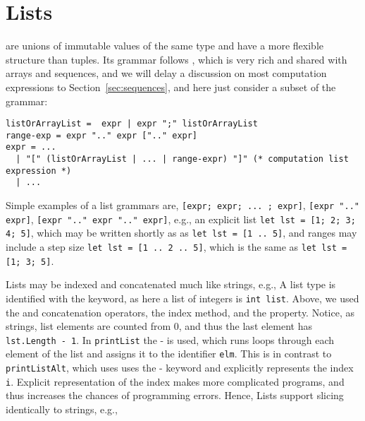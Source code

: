 \section{Lists}
 are unions of immutable values of the same type and have a more flexible structure than tuples. Its grammar follows , which is very rich and shared with arrays and sequences, and we will delay a discussion on most computation expressions to Section~\ref{sec:sequences}, and here just consider a subset of the grammar:
\begin{lstlisting}[language=ebnf]
listOrArrayList =  expr | expr ";" listOrArrayList
range-exp = expr ".." expr [".." expr]
expr = ... 
  | "[" (listOrArrayList | ... | range-expr) "]" (* computation list expression *)
  | ...
\end{lstlisting}
Simple examples of a list grammars are, \lstinline[language=ebnf]![expr; expr; ... ; expr]!, \lstinline[language=ebnf]![expr ".." expr]!, \lstinline[language=ebnf]![expr ".." expr ".." expr]!, e.g., an explicit list \lstinline!let lst = [1; 2; 3; 4; 5]!, which may be written shortly as  as \lstinline!let lst = [1 .. 5]!, and ranges may include a step size \lstinline!let lst = [1 .. 2 .. 5]!, which is the same as \lstinline!let lst = [1; 3; 5]!.

Lists may be indexed and concatenated much like strings, e.g.,
%
%
A list type is identified with the  keyword, as here a list of integers is \lstinline!int list!. Above, we used the  and \idx{\lexeme{::}} concatenation operators, the  index method, and the  property. Notice, as strings, list elements are counted from 0, and thus the last element has \lstinline!lst.Length - 1!. In \lstinline!printList! the - is used, which runs loops through each element of the list and assigns it to the identifier \lstinline!elm!. This is in contrast to \lstinline!printListAlt!, which uses uses the - keyword and explicitly represents the index \lstinline!i!. Explicit representation of the index makes more complicated programs, and thus increases the chances of programming errors. Hence,  Lists support slicing identically to strings, e.g.,
%
%

